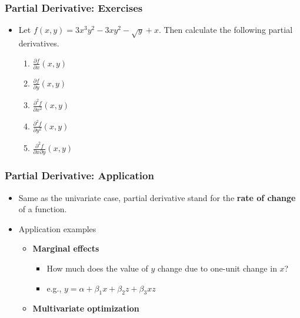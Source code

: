 \documentclass[pdflatex, 12pt]{beamer}
\begin{document}
\begin{frame}
\frametitle{Partial Derivative: Exercises}
\begin{itemize}
\item Let $f(x, y) = 3x^3y^2 - 3xy^2 - \sqrt{y} + x$. Then calculate the following partial derivatives.
 \begin{enumerate}
 \item $\frac{\partial f}{\partial x} (x, y)$
 \vspace{0.1cm}
 \item $\frac{\partial f}{\partial y} (x, y)$
 \vspace{0.1cm}
 \item $\frac{\partial^2 f}{\partial x^2} (x, y)$
 \vspace{0.1cm}
 \item $\frac{\partial^2 f}{\partial y^2} (x, y)$
 \vspace{0.1cm}
 \item $\frac{\partial^2 f}{\partial x \partial y} (x, y)$
 \end{enumerate}
\end{itemize}
\end{frame}

\begin{frame}
\frametitle{Partial Derivative: Application}
\begin{itemize}
\item Same as the univariate case, partial derivative stand for the \textbf{rate of change} of a function.
\vspace{0.4cm}
\item Application examples
 \begin{itemize}
 \item \textbf{Marginal effects}
  \begin{itemize}
  \item How much does the value of $y$ change due to one-unit change in $x$?
  \item e.g., $y = \alpha + \beta_1 x + \beta_2 z + \beta_3 xz$  
  \end{itemize}
 \item \textbf{Multivariate optimization}
 \end{itemize} 
\end{itemize}
\end{frame}
\end{document}
